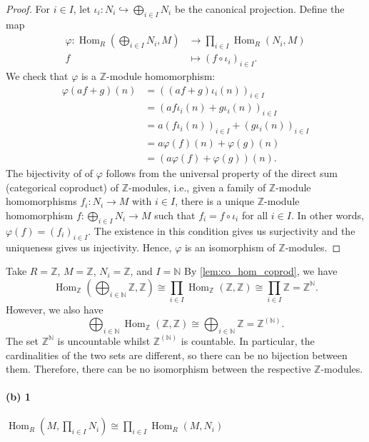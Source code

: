 \documentclass[12pt]{article}
\newlength{\myparskip}
\newenvironment{fullbox}{\begin{lrbox}{\savefullbox}\begin{minipage}{\dimexpr\textwidth-2\fboxsep\relax}\setlength{\parskip}{\myparskip}}{\end{minipage}\end{lrbox}\framebox[\textwidth]{\usebox{\savefullbox}}}
\newenvironment{pbox}[1][]{\begin{fullbox}\def\temp{#1}\ifx\temp\empty\else\paragraph{#1}\phantom{}\fi}{\end{fullbox}}
\theoremstyle{definition}
\newcommand{\N}{\mathbb{N}}
\newcommand{\Z}{\mathbb{Z}}
\renewcommand{\phi}{\varphi}
\newcommand{\<}{\langle}
\renewcommand{\>}{\rangle}
\newcommand{\iso}{\cong}
\newcommand{\inc}{\hookrightarrow}
\renewcommand{\_}[1]{{_{#1}}}
\DeclareMathOperator{\Hom}{Hom}
\begin{document}
\begin{proof}
    For $i \in I$, let $\iota_i : N_i \inc \bigoplus_{i\in I} N_i$ be the canonical projection.
    Define the map
    \begin{align*}
        \phi : \Hom_R(\textstyle\bigoplus_{i \in I} N_i, M) &\to \textstyle\prod_{i\in I} \Hom_R(N_i, M) \\
            f &\mapsto (f \circ \iota_i)_{i \in I}.
    \end{align*}
    We check that $\phi$ is a $\Z$-module homomorphism:
    \begin{align*}
        \phi(af + g)(n)
            &= ((af + g)\iota_i(n))_{i \in I} \\
            &= (af\iota_i(n) + g\iota_i(n))_{i \in I} \\
            &= a(f\iota_i(n))_{i \in I} + (g\iota_i(n))_{i \in I} \\
            &= a\phi(f)(n) + \phi(g)(n) \\
            &= (a\phi(f) + \phi(g))(n).
    \end{align*}
    The bijectivity of of $\phi$ follows from the universal property of the direct sum (categorical coproduct) of $\Z$-modules, i.e., given a family of $\Z$-module homomorphisms $f_i : N_i \to M$ with $i \in I$, there is a unique $\Z$-module homomorphism $f : \bigoplus_{i \in I} N_i \to M$ such that $f_i = f \circ \iota_i$ for all $i \in I$.
    In other words, $\phi(f) = (f_i)_{i \in I}$.
    The existence in this condition gives us surjectivity and the uniqueness gives us injectivity.
    Hence, $\phi$ is an isomorphism of $\Z$-modules.
\end{proof}

Take $R = \Z$, $M = \Z$, $N_i = \Z$, and $I = \N$
By \ref{lem:co_hom_coprod}, we have
\[\textstyle
    \Hom_\Z(\bigoplus_{i\in\N} \Z, \Z)
        \iso \prod_{i \in I} \Hom_\Z(\Z, \Z)
        \iso \prod_{i \in I} \Z
        = \Z^\N.
\]
However, we also have
\[
    \bigoplus_{i\in\N} \Hom_\Z(\Z, \Z)
        \iso \bigoplus_{i\in\N} \Z
        = \Z^{(\N)}.
\]
The set $\Z^\N$ is uncountable whilst $\Z^{(\N)}$ is countable.
In particular, the cardinalities of the two sets are different, so there can be no bijection between them.
Therefore, there can be no isomorphism between the respective $\Z$-modules.


\begin{pbox}[(b) 1]
    $\Hom_R(M, \prod_{i\in I} N_i) \iso \prod_{i\in I} \Hom_R(M, N_i)$
\end{pbox}
\end{document}
